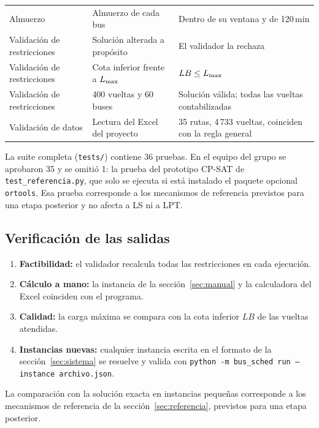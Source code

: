 {\begin{longtable}{L{2.9cm}L{6.4cm}L{5.4cm}}
Almuerzo & Almuerzo de cada bus & Dentro de su ventana y de 120\,min \\
Validación de restricciones & Solución alterada a propósito & El validador la rechaza \\
Validación de restricciones & Cota inferior frente a $L_{\max}$ & $LB \le L_{\max}$ \\
Validación de restricciones & 400 vueltas y 60 buses & Solución válida; todas las vueltas contabilizadas \\
Validación de datos & Lectura del Excel del proyecto & 35 rutas, 4\,733 vueltas, coinciden con la regla general \\
\end{longtable}}

La suite completa (\texttt{tests/}) contiene 36 pruebas. En el equipo del grupo se aprobaron 35 y se omitió 1: la prueba del prototipo CP-SAT de \texttt{test\_referencia.py}, que solo se ejecuta si está instalado el paquete opcional \texttt{ortools}. Esa prueba corresponde a los mecanismos de referencia previstos para una etapa posterior y no afecta a LS ni a LPT.


\subsection{Verificación de las salidas}
\begin{enumerate}
  \item \textbf{Factibilidad:} el validador recalcula todas las restricciones en cada ejecución.
  \item \textbf{Cálculo a mano:} la instancia de la sección~\ref{sec:manual} y la calculadora del Excel coinciden con el programa.
  \item \textbf{Calidad:} la carga máxima se compara con la cota inferior $LB$ de las vueltas atendidas.
  \item \textbf{Instancias nuevas:} cualquier instancia escrita en el formato de la sección~\ref{sec:sistema} se resuelve y valida con \texttt{python -m bus\_sched run --instance archivo.json}.
\end{enumerate}
La comparación con la solución exacta en instancias pequeñas corresponde a los mecanismos de referencia de la sección~\ref{sec:referencia}, previstos para una etapa posterior.
